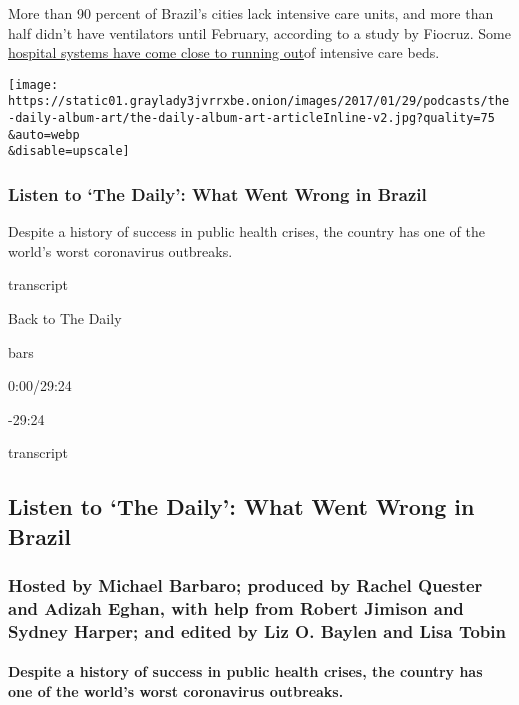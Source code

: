 More than 90 percent of Brazil's cities lack intensive care units, and
more than half didn't have ventilators until February, according to a
study by Fiocruz. Some
\href{https://www1.folha.uol.com.br/cotidiano/2020/06/noves-estados-estao-com-mais-de-80-das-utis-lotadas.shtml}{hospital
systems have come close to running out}of intensive care beds.

\texttt{[image: https://static01.graylady3jvrrxbe.onion/images/2017/01/29/podcasts/the-daily-album-art/the-daily-album-art-articleInline-v2.jpg?quality=75\\\&auto=webp\\\&disable=upscale]}

\hypertarget{listen-to-the-daily-what-went-wrong-in-brazil}{%
\subsubsection{Listen to `The Daily': What Went Wrong in
Brazil}\label{listen-to-the-daily-what-went-wrong-in-brazil}}

Despite a history of success in public health crises, the country has
one of the world's worst coronavirus outbreaks.

transcript

Back to The Daily

bars

0:00/29:24

-29:24

transcript

\hypertarget{listen-to-the-daily-what-went-wrong-in-brazil-1}{%
\subsection{Listen to `The Daily': What Went Wrong in
Brazil}\label{listen-to-the-daily-what-went-wrong-in-brazil-1}}

\hypertarget{hosted-by-michael-barbaro-produced-by-rachel-quester-and-adizah-eghan-with-help-from-robert-jimison-and-sydney-harper-and-edited-by-liz-o-baylen-and-lisa-tobin}{%
\subsubsection{Hosted by Michael Barbaro; produced by Rachel Quester and
Adizah Eghan, with help from Robert Jimison and Sydney Harper; and
edited by Liz O. Baylen and Lisa
Tobin}\label{hosted-by-michael-barbaro-produced-by-rachel-quester-and-adizah-eghan-with-help-from-robert-jimison-and-sydney-harper-and-edited-by-liz-o-baylen-and-lisa-tobin}}

\hypertarget{despite-a-history-of-success-in-public-health-crises-the-country-has-one-of-the-worlds-worst-coronavirus-outbreaks}{%
\paragraph{Despite a history of success in public health crises, the
country has one of the world's worst coronavirus
outbreaks.}\label{despite-a-history-of-success-in-public-health-crises-the-country-has-one-of-the-worlds-worst-coronavirus-outbreaks}}

